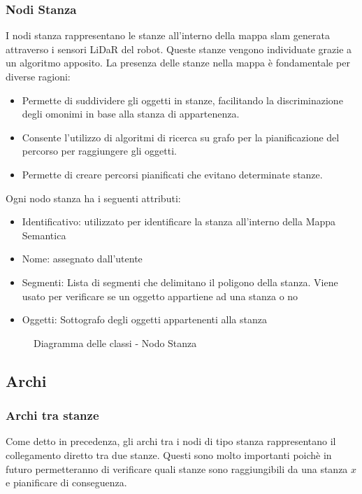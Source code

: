 \subsubsection{Nodi Stanza}
I nodi stanza rappresentano le stanze all'interno della mappa slam generata attraverso i sensori LiDaR del robot. Queste stanze vengono individuate grazie a un algoritmo apposito. La presenza delle stanze nella mappa è fondamentale per diverse ragioni:
\begin{itemize}
  \item Permette di suddividere gli oggetti in stanze, facilitando la discriminazione degli omonimi in base alla stanza di appartenenza.
  \item Consente l'utilizzo di algoritmi di ricerca su grafo per la pianificazione del percorso per raggiungere gli oggetti.
  \item Permette di creare percorsi pianificati che evitano determinate stanze.
\end{itemize}
Ogni nodo stanza ha i seguenti attributi:
\begin{itemize}
  \item Identificativo: utilizzato per identificare la stanza all'interno della Mappa Semantica
  \item Nome: assegnato dall'utente
  \item Segmenti: Lista di segmenti che delimitano il poligono della stanza. Viene usato per verificare se un oggetto appartiene ad una stanza o no
  \item Oggetti: Sottografo degli oggetti appartenenti alla stanza
\end{itemize}

\begin{figure}[h]
  \centering
  \caption{Diagramma delle classi - Nodo Stanza}
\end{figure}
\subsection{Archi}
\subsubsection{Archi tra stanze}
Come detto in precedenza, gli archi tra i nodi di tipo stanza rappresentano il collegamento diretto tra due stanze. Questi sono molto importanti poichè in futuro permetteranno di verificare quali stanze sono raggiungibili da una stanza $x$ e pianificare di conseguenza. 

